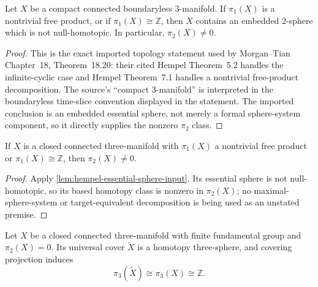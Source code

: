 \begin{lemma}
\label{lem:hempel-essential-sphere-input}
\notready
Let $X$ be a compact connected boundaryless $3$-manifold.  If
$\pi_1(X)$ is a nontrivial free product, or if $\pi_1(X)\cong\mathbb Z$, then
$X$ contains an embedded $2$-sphere which is not null-homotopic.  In
particular, $\pi_2(X)\ne0$.
\end{lemma}

\begin{proof}
This is the exact imported topology statement used by Morgan--Tian
Chapter~18, Theorem~18.20: their cited Hempel Theorem~5.2 handles the
infinite-cyclic case and Hempel Theorem~7.1 handles a nontrivial free-product
decomposition.  The source's ``compact $3$-manifold'' is interpreted in the
boundaryless time-slice convention displayed in the statement.  The imported
conclusion is an embedded essential sphere, not merely a formal
sphere-system component, so it directly supplies the nonzero $\pi_2$ class.
\end{proof}

\begin{theorem}
\label{thm:free-product-pi2-obstruction}
\notready
If $X$ is a closed connected three-manifold with $\pi_1(X)$ a nontrivial
free product or $\pi_1(X)\cong\mathbb Z$, then $\pi_2(X)\ne0$.
\end{theorem}

\begin{proof}
Apply \ref{lem:hempel-essential-sphere-input}.  Its essential sphere is not
null-homotopic, so its based homotopy class is nonzero in $\pi_2(X)$; no
maximal-sphere-system or target-equivalent decomposition is being used as an
unstated premise.
\end{proof}


\begin{theorem}
\label{thm:finite-cover-homotopy-three-sphere}
\notready
Let $X$ be a closed connected three-manifold with finite fundamental group
and $\pi_2(X)=0$.  Its universal cover $\widetilde X$ is a homotopy
three-sphere, and covering projection induces
\[
 \pi_3(\widetilde X)\cong\pi_3(X)\cong\mathbb Z.
\]
\end{theorem}

